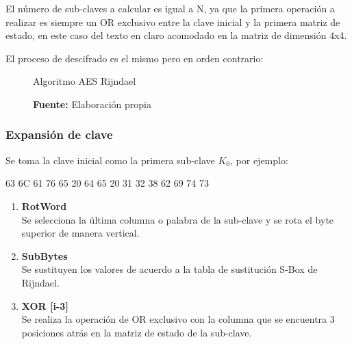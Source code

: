 \documentclass[../main/main.tex]{subfiles}
\begin{document}
  El número de sub-claves a calcular es igual a N, ya que la primera operación a realizar es siempre un OR exclusivo entre la clave inicial y la primera matriz de estado, en este caso del texto en claro acomodado en la matriz de dimensión 4x4.
  
  El proceso de descifrado es el mismo pero en orden contrario:

  \begin{figure}[H]
    \centering
    \caption{Algoritmo AES Rijndael}
    
    \caption*{\textbf{Fuente:} Elaboración propia}
  \end{figure}

  \subsubsection{Expansión de clave}

  Se toma la clave inicial como la primera sub-clave $K_0$, por ejemplo:

  \begin{center}
    63 6C 61 76 65 20 64 65 20 31 32 38 62 69 74 73
  \end{center}

  \begin{enumerate}[label=\textbf{\arabic*}.]
    \item \textbf{RotWord} \\
      Se selecciona la última columna o palabra de la sub-clave y se rota el byte superior de manera vertical.

      \begin{table}[H]
        \centering
        
      \end{table}

    \item \textbf{SubBytes} \\
      Se sustituyen los valores de acuerdo a la tabla de sustitución S-Box de Rijndael.

      \begin{table}[H]
        \centering
        
      \end{table}

    \item \textbf{XOR [i-3]} \\
      Se realiza la operación de OR exclusivo con la columna que se encuentra 3 posiciones atrás en la matriz de estado de la sub-clave.

      \begin{table}[H]
        \centering
        
      \end{table}

      
  \end{enumerate}
\end{document}
